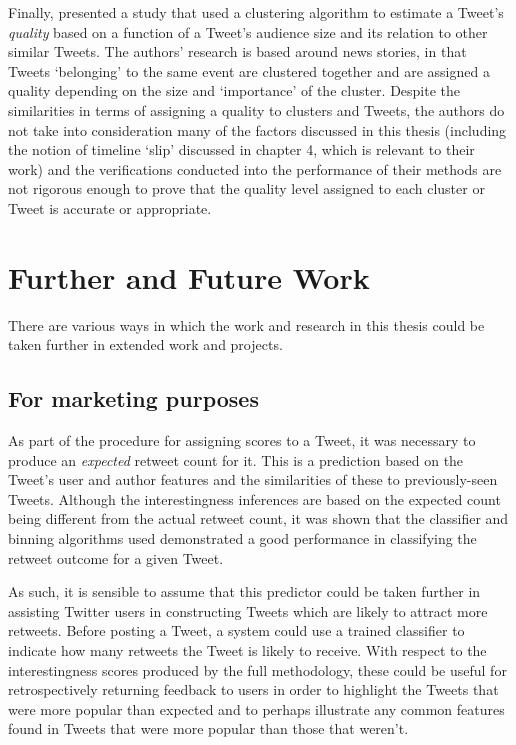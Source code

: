 Finally, \cite{lauw10} presented a study that used a clustering algorithm to estimate a Tweet's \textit{quality} based on a function of a Tweet's audience size and its relation to other similar Tweets. The authors' research is based around news stories, in that Tweets `belonging' to the same event are clustered together and are assigned a quality depending on the size and `importance' of the cluster. Despite the similarities in terms of assigning a quality to clusters and Tweets, the authors do not take into consideration many of the factors discussed in this thesis (including the notion of timeline `slip' discussed in chapter 4, which is relevant to their work) and the verifications conducted into the performance of their methods are not rigorous enough to prove that the quality level assigned to each cluster or Tweet is accurate or appropriate.


\section{Further and Future Work}
There are various ways in which the work and research in this thesis could be taken further in extended work and projects.


\subsection{For marketing purposes}
As part of the procedure for assigning scores to a Tweet, it was necessary to produce an \textit{expected} retweet count for it. This is a prediction based on the Tweet's user and author features and the similarities of these to previously-seen Tweets. Although the interestingness inferences are based on the expected count being different from the actual retweet count, it was shown that the classifier and binning algorithms used demonstrated a good performance in classifying the retweet outcome for a given Tweet. 

As such, it is sensible to assume that this predictor could be taken further in assisting Twitter users in constructing Tweets which are likely to attract more retweets. Before posting a Tweet, a system could use a trained classifier to indicate how many retweets the Tweet is likely to receive. With respect to the interestingness scores produced by the full methodology, these could be useful for retrospectively returning feedback to users in order to highlight the Tweets that were more popular than expected and to perhaps illustrate any common features found in Tweets that were more popular than those that weren't. 

